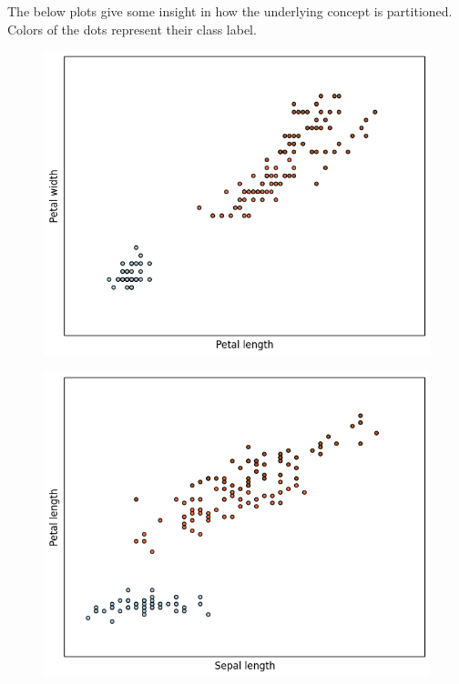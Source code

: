 \documentclass[12pt]{article}
\begin{document}
The below plots give some insight in how the underlying concept is partitioned. Colors of the dots represent their class label. 
\begin{figure}[!ht]
\centering
\includegraphics[scale=0.6]{images/petal_length-petal_width.png}
\end{figure}
\begin{figure}[!ht]
\centering
\includegraphics[scale=0.6]{images/sepal_length-petal_length.png}
\end{figure}
\end{document}
